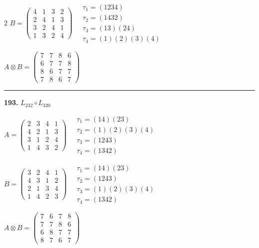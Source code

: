 \begin{multicols}{2}
$B = \begin{pmatrix} 4 & 1 & 3 & 2 \\ 2 & 4 & 1 & 3 \\ 3 & 2 & 4 & 1 \\ 1 & 3 & 2 & 4 \end{pmatrix} \quad \begin{matrix} \tau_{1}=(1 2 3 4) \\ \tau_{2}=(1 4 3 2) \\ \tau_{3}=(1 3)(2 4) \\ \tau_{4}=(1)(2)(3)(4) \end{matrix}$

$A \otimes B = \begin{pmatrix} 7 & 7 & 8 & 6 \\ 6 & 7 & 7 & 8 \\ 8 & 6 & 7 & 7 \\ 7 & 8 & 6 & 7 \end{pmatrix}$

\vspace{0.3em}
\hrule
\vspace{0.3em}

\noindent\textbf{193.} $L_{232} \circ L_{320}$

$A = \begin{pmatrix} 2 & 3 & 4 & 1 \\ 4 & 2 & 1 & 3 \\ 3 & 1 & 2 & 4 \\ 1 & 4 & 3 & 2 \end{pmatrix} \quad \begin{matrix} \tau_{1}=(1 4)(2 3) \\ \tau_{2}=(1)(2)(3)(4) \\ \tau_{3}=(1 2 4 3) \\ \tau_{4}=(1 3 4 2) \end{matrix}$

$B = \begin{pmatrix} 3 & 2 & 4 & 1 \\ 4 & 3 & 1 & 2 \\ 2 & 1 & 3 & 4 \\ 1 & 4 & 2 & 3 \end{pmatrix} \quad \begin{matrix} \tau_{1}=(1 4)(2 3) \\ \tau_{2}=(1 2 4 3) \\ \tau_{3}=(1)(2)(3)(4) \\ \tau_{4}=(1 3 4 2) \end{matrix}$

$A \otimes B = \begin{pmatrix} 7 & 6 & 7 & 8 \\ 7 & 7 & 8 & 6 \\ 6 & 8 & 7 & 7 \\ 8 & 7 & 6 & 7 \end{pmatrix}$


\end{multicols}
